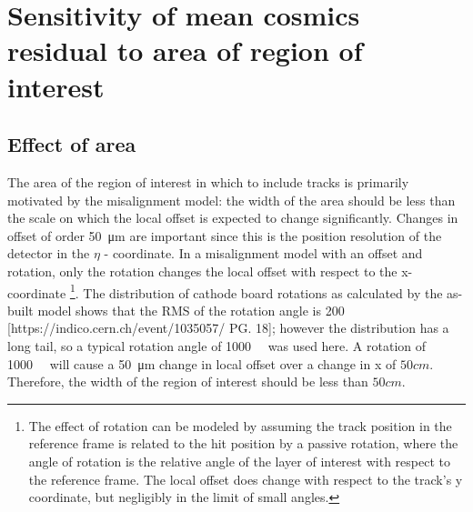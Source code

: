 \chapter[Effect of area bin size on results]{Sensitivity of mean cosmics residual to area of region of interest}
\label{appendix-area_bin_size}

\section{Effect of area}


The area of the region of interest in which to include tracks is primarily motivated by the misalignment model: the width of the area should be less than the scale on which the local offset is expected to change significantly. Changes in offset of order \SI{50}{\micro\meter} are important since this is the position resolution of the detector in the $\eta$ - coordinate. In a misalignment model with an offset and rotation, only the rotation changes the local offset with respect to the x-coordinate \footnote{The effect of rotation can be modeled by assuming the track position in the reference frame is related to the hit position by a passive rotation, where the angle of rotation is the relative angle of the layer of interest with respect to the reference frame. The local offset does change with respect to the track's y coordinate, but negligibly in the limit of small angles.}.  The distribution of cathode board rotations as calculated by the as-built model shows that the RMS of the rotation angle is \SI{200}{\micro\rangle} [https://indico.cern.ch/event/1035057/ PG. 18]; however the distribution has a long tail, so a typical rotation angle of \SI{1000}{\micro\rangle} was used here. A rotation of \SI{1000}{\micro\rangle} will cause a \SI{50}{\micro\meter} change in local offset over a change in x of $50 cm$. Therefore, the width of the region of interest should be less than $50 cm$.

